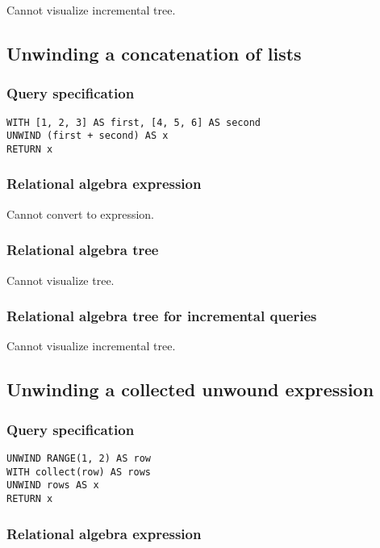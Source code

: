 Cannot visualize incremental tree.

\subsection{Unwinding a concatenation of lists}

\subsubsection*{Query specification}

\begin{lstlisting}
WITH [1, 2, 3] AS first, [4, 5, 6] AS second
UNWIND (first + second) AS x
RETURN x
\end{lstlisting}

\subsubsection*{Relational algebra expression}

Cannot convert to expression.

\subsubsection*{Relational algebra tree}

Cannot visualize tree.

\subsubsection*{Relational algebra tree for incremental queries}

Cannot visualize incremental tree.

\subsection{Unwinding a collected unwound expression}

\subsubsection*{Query specification}

\begin{lstlisting}
UNWIND RANGE(1, 2) AS row
WITH collect(row) AS rows
UNWIND rows AS x
RETURN x
\end{lstlisting}

\subsubsection*{Relational algebra expression}


